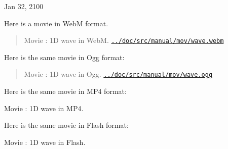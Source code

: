 \documentclass[%
oneside,                 %
final,                   %
10pt]{article}
\newenvironment{doconce:movie}{}{}
\newcounter{doconce:movie:counter}
\begin{document}
\begin{center}
Jan 32, 2100
\end{center}
\vspace{1cm}
Here is a movie in WebM format.
\begin{doconce:movie}
\begin{quote}
Movie : 1D wave in WebM. \href{run:../doc/src/manual/mov/wave.webm}{\nolinkurl{../doc/src/manual/mov/wave.webm}}
\end{quote}
\end{doconce:movie}
Here is the same movie in Ogg format:
\begin{doconce:movie}
\begin{quote}
Movie : 1D wave in Ogg. \href{run:../doc/src/manual/mov/wave.ogg}{\nolinkurl{../doc/src/manual/mov/wave.ogg}}
\end{quote}
\end{doconce:movie}
Here is the same movie in MP4 format:
\begin{doconce:movie}
\begin{center}
\end{center}
\begin{center}  %
Movie : 1D wave in MP4.
\end{center}
\end{doconce:movie}
Here is the same movie in Flash format:
\begin{doconce:movie}
\begin{center}
\end{center}
\begin{center}  %
Movie : 1D wave in Flash.
\end{center}
\end{doconce:movie}
\end{document}
